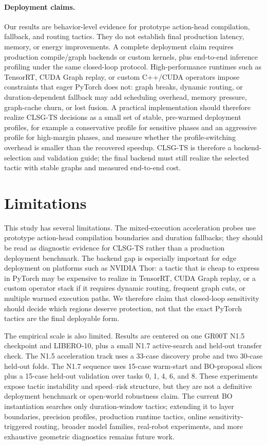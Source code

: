\documentclass[10pt]{article}
\begin{document}
\paragraph{Deployment claims.}
Our results are behavior-level evidence for prototype action-head compilation, fallback, and routing tactics. They do not establish final production latency, memory, or energy improvements. A complete deployment claim requires production compile/graph backends or custom kernels, plus end-to-end inference profiling under the same closed-loop protocol. High-performance runtimes such as TensorRT, CUDA Graph replay, or custom C++/CUDA operators impose constraints that eager PyTorch does not: graph breaks, dynamic routing, or duration-dependent fallback may add scheduling overhead, memory pressure, graph-cache churn, or lost fusion. A practical implementation should therefore realize CLSG-TS decisions as a small set of stable, pre-warmed deployment profiles, for example a conservative profile for sensitive phases and an aggressive profile for high-margin phases, and measure whether the profile-switching overhead is smaller than the recovered speedup. CLSG-TS is therefore a backend-selection and validation guide; the final backend must still realize the selected tactic with stable graphs and measured end-to-end cost.

\section{Limitations}

This study has several limitations. The mixed-execution acceleration probes use prototype action-head compilation boundaries and duration fallbacks; they should be read as diagnostic evidence for CLSG-TS rather than a production deployment benchmark. The backend gap is especially important for edge deployment on platforms such as NVIDIA Thor: a tactic that is cheap to express in PyTorch may be expensive to realize in TensorRT, CUDA Graph replay, or a custom operator stack if it requires dynamic routing, frequent graph cuts, or multiple warmed execution paths. We therefore claim that closed-loop sensitivity should decide which regions deserve protection, not that the exact PyTorch tactics are the final deployable form.

The empirical scale is also limited. Results are centered on one GR00T N1.5 checkpoint and LIBERO-10, plus a small N1.7 active-search and held-out transfer check. The N1.5 acceleration track uses a 33-case discovery probe and two 30-case held-out folds. The N1.7 sequence uses 15-case warm-start and BO-proposal slices plus a 15-case held-out validation over tasks 0, 1, 4, 6, and 8. These experiments expose tactic instability and speed--risk structure, but they are not a definitive deployment benchmark or open-world robustness claim. The current BO instantiation searches only duration-window tactics; extending it to layer boundaries, precision profiles, production runtime tactics, online sensitivity-triggered routing, broader model families, real-robot experiments, and more exhaustive geometric diagnostics remains future work.
\end{document}
